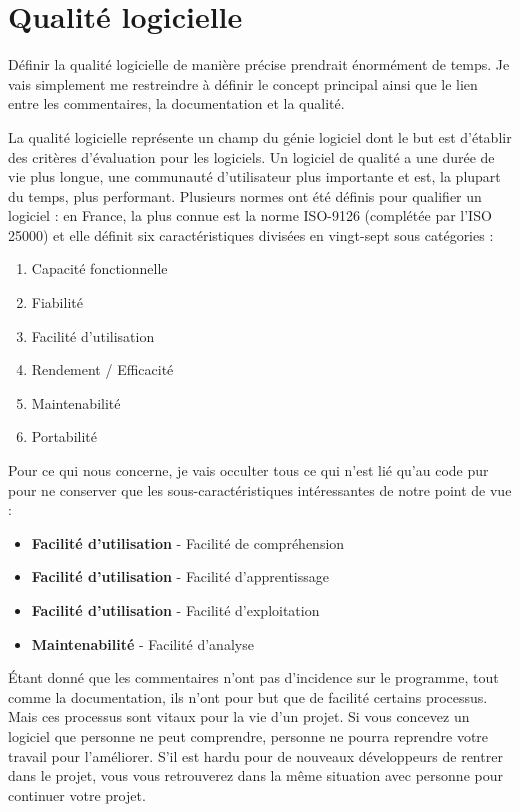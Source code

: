 \documentclass[10pt,a4paper,twoside, openany]{report}
\begin{document}
\section{Qualit\'e logicielle}

D\'efinir la qualit\'e logicielle de mani\`ere pr\'ecise prendrait \'enorm\'ement de temps. Je vais simplement me restreindre \`a d\'efinir le concept principal ainsi que le lien entre les commentaires, la documentation et la qualit\'e.\newline

La qualit\'e logicielle repr\'esente un champ du g\'enie logiciel dont le but est d'\'etablir des crit\`eres d'\'evaluation pour les logiciels. Un logiciel de qualit\'e a une dur\'ee de vie plus longue, une communaut\'e d'utilisateur plus importante et est, la plupart du temps, plus performant. Plusieurs normes ont \'et\'e d\'efinis pour qualifier un logiciel : en France, la plus connue est la norme ISO-9126 (compl\'et\'ee par l'ISO 25000) et elle d\'efinit six caract\'eristiques divis\'ees en vingt-sept sous cat\'egories :

\begin{enumerate}
\item{Capacit\'e fonctionnelle}
\item{Fiabilit\'e}
\item{Facilit\'e d'utilisation}
\item{Rendement / Efficacit\'e}
\item{Maintenabilit\'e}
\item{Portabilit\'e}
\end{enumerate}

Pour ce qui nous concerne, je vais occulter tous ce qui n'est li\'e qu'au code pur pour ne conserver que les sous-caract\'eristiques int\'eressantes de notre point de vue :

\begin{itemize}
\item{\textbf{Facilit\'e d'utilisation} - Facilit\'e de compr\'ehension}
\item{\textbf{Facilit\'e d'utilisation} - Facilit\'e d'apprentissage}
\item{\textbf{Facilit\'e d'utilisation} - Facilit\'e d'exploitation}
\item{\textbf{Maintenabilit\'e} - Facilit\'e d'analyse}
\end{itemize}

\'Etant donn\'e que les commentaires n'ont pas d'incidence sur le programme, tout comme la documentation, ils n'ont pour but que de facilit\'e certains processus. Mais ces processus sont vitaux pour la vie d'un projet. Si vous concevez un logiciel que personne ne peut comprendre, personne ne pourra reprendre votre travail pour l'am\'eliorer. S'il est hardu pour de nouveaux d\'eveloppeurs de rentrer dans le projet, vous vous retrouverez dans la m\^eme situation avec personne pour continuer votre projet.\newline
\end{document}
